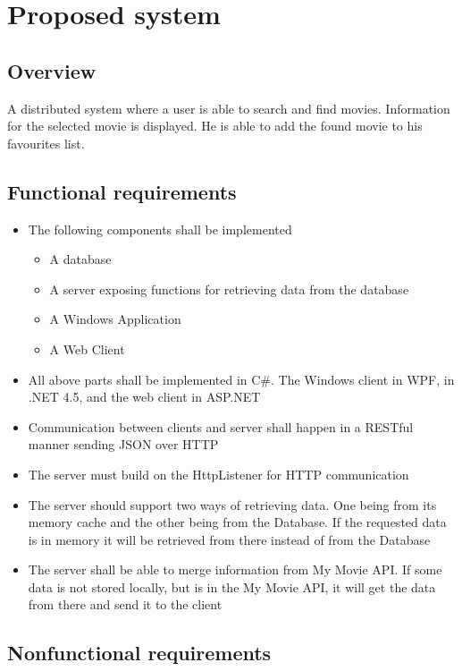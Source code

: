 \chapter{Proposed system}
\label{sec:proposed system}

\section{Overview}
A distributed system where a user is able to search and find movies. Information for the selected movie is displayed. He is able to add the found movie to his favourites list.

\section{Functional requirements}
\begin{itemize}
	\setlength{\itemsep}{-5pt}
	\item The following components shall be implemented
	\begin{itemize}
		\setlength{\itemsep}{-5pt}
		\item A database
		\item A server exposing functions for retrieving data from the database
		\item A Windows Application
		\item A Web Client
	\end{itemize}
	\item All above parts shall be implemented in C\#. The Windows client in WPF, in .NET 4.5, and the web client in ASP.NET
	\item Communication between clients and server shall happen in a RESTful manner sending JSON over HTTP
	\item The server must build on the HttpListener for HTTP communication
	\item The server should support two ways of retrieving data. One being from its memory cache and the other being from the Database. If the requested data is in memory it will be retrieved from there instead of from the Database
	\item The server shall be able to merge information from My Movie API. If some data is not stored locally, but is in the My Movie API, it will get the data from there and send it to the client
\end{itemize}

\section{Nonfunctional requirements}

